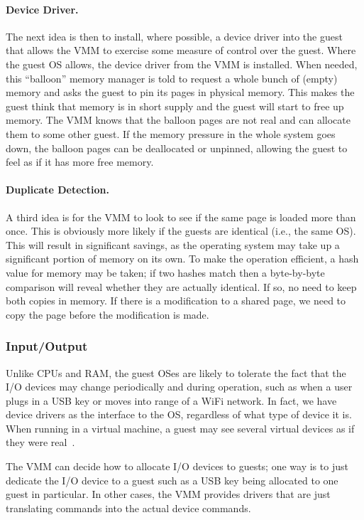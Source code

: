 \paragraph{Device Driver.} The next idea is then to install, where possible, a device driver into the guest that allows the VMM to exercise some measure of control over the guest. Where the guest OS allows, the device driver from the VMM is installed. When needed, this ``balloon'' memory manager is told to request a whole bunch of (empty) memory and asks the guest to pin its pages in physical memory. This makes the guest think that memory is in short supply and the guest will start to free up memory. The VMM knows that the balloon pages are not real and can allocate them to some other guest. If the memory pressure in the whole system goes down, the balloon pages can be deallocated or unpinned, allowing the guest to feel as if it has more free memory.

\paragraph{Duplicate Detection.} A third idea is for the VMM to look to see if the same page is loaded more than once. This is obviously more likely if the guests are identical (i.e., the same OS). This will result in significant savings, as the operating system may take up a significant portion of memory on its own. To make the operation efficient, a hash value for memory may be taken; if two hashes match then a byte-by-byte comparison will reveal whether they are actually identical. If so, no need to keep both copies in memory. If there is a modification to a shared page, we need to copy the page before the modification is made.

\subsubsection*{Input/Output}
Unlike CPUs and RAM, the guest OSes are likely to tolerate the fact that the I/O devices may change periodically and during operation, such as when a user plugs in a USB key or moves into range of a WiFi network. In fact, we have device drivers as the interface to the OS, regardless of what type of device it is. When running in a virtual machine, a guest may see several virtual devices as if they were real~\cite{osc}.

The VMM can decide how to allocate I/O devices to guests; one way is to just dedicate the I/O device to a guest such as a USB key being allocated to one guest in particular. In other cases, the VMM provides drivers that are just translating commands into the actual device commands. 

